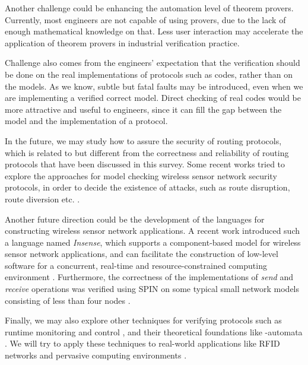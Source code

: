 \documentclass[a4paper,10pt,twocolumn]{article}
\begin{document}
Another challenge could be enhancing the automation level of theorem provers. Currently, most engineers are not capable of using provers, due to the lack of enough mathematical knowledge on that. Less user interaction may accelerate the application of theorem provers in industrial verification practice.

Challenge also comes from the engineers' expectation that the verification should be done on the real implementations of protocols such as codes, rather than on the models. As we know, subtle but fatal faults may be introduced, even when we are implementing a verified correct model. Direct checking of real codes would be more attractive and useful to engineers, since it can fill the gap between the model and the implementation of a protocol.

In the future, we may study how to assure the security of routing protocols, which is related to but different from the correctness and reliability of routing protocols that have been discussed in this survey. Some recent works tried to explore the approaches for model checking wireless sensor network security protocols, in order to decide the existence of attacks, such as route disruption, route diversion etc. \cite{TCCDC09,BMV10}.

Another future direction could be the development of the languages for constructing wireless sensor network applications. A recent work introduced such a language named \emph{Insense}, which supports a component-based model for wireless sensor network applications, and can facilitate the construction of low-level software for a concurrent, real-time and resource-constrained computing environment \cite{DBLM08}. Furthermore, the correctness of the implementations of \emph{send} and \emph{receive} operations was verified using SPIN on some typical small network models consisting of less than four nodes \cite{SLMDBMS09}.

Finally, we may also explore other techniques for verifying protocols such as runtime monitoring and control \cite{CM10a,CM09d}, and their theoretical foundations like -automata \cite{Chen11}. We will try to apply these techniques to real-world applications like RFID networks \cite{ZZG11} and pervasive computing environments \cite{ZCH11,ZZL12}.
\end{document}
